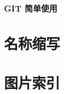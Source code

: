 \documentclass[amstex,twoside]{ctexbook}
\begin{document}
\subsection{  GIT 简单使用	}


\appendix



\chapter{名称缩写}

\chapter{图片索引}
{
\renewcommand{\cleardoublepage}{}

\renewcommand\listfigurename{}
\vskip -3cm
\listoffigures 
}


\end{document}
